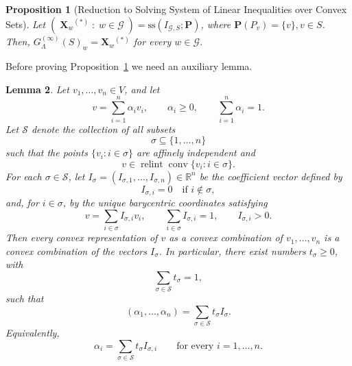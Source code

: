 \documentclass[10pt]{amsart}
\theoremstyle{plain}
\newtheorem{lemma}{Lemma}[section]
\newtheorem{proposition}[lemma]{Proposition}
\theoremstyle{definition}
\providecommand{\cG}[0]{\ensuremath{\mathcal G}\xspace}
\providecommand{\bP}[0]{\ensuremath{\mathbf P}\xspace}
\providecommand{\bX}[0]{\ensuremath{\mathbf X}\xspace}
\let\geq\geqslant
\providecommand{\p}[1]{\ensuremath{^{\left(#1\right)}}\xspace}
\providecommand{\ssol}{\ensuremath{\mathrm{ss}}\xspace}
\begin{document}
\begin{proposition}[Reduction to Solving System of Linear Inequalities over Convex Sets]
\label{prop:reduction-lam-system}
    Let 
    $\left( \; \bX_w\p* \;\colon\; w\in\cG \; \right) = \ssol(I_{\cG,S};\bP)$,
    where $\bP(P_v) = \{v\}, v \in S$.
    Then, $G^{(\infty)}_\Lambda(S)_w = \bX_w\p*$ for every $w\in\cG$. 
\end{proposition}

Before proving Proposition~\ref{prop:reduction-lam-system} we need an auxiliary lemma.

\begin{lemma}
\label{lem:new}
Let \(v_1,\ldots,v_n \in 
V\), and let
\[
v=\sum_{i=1}^n \alpha_i v_i,
\qquad 
\alpha_i\geq 0,
\qquad
\sum_{i=1}^n \alpha_i=1.
\]
Let \(\mathcal S\) denote the collection of all subsets
\[
\sigma \subseteq \{1,\ldots,n\}
\]
such that the points \(\{v_i : i\in \sigma\}\) are affinely independent and
\[
v \in \operatorname{relint}
\operatorname{conv}\{v_i : i\in \sigma\}.
\]
For each \(\sigma\in\mathcal S\), let \(I_\sigma=(I_{\sigma,1},\ldots,I_{\sigma,n})\in\mathbb{R}^n\) be the coefficient vector defined by
\[
I_{\sigma,i}=0 \quad\text{if } i\notin \sigma,
\]
and, for \(i\in \sigma\), by the unique barycentric coordinates satisfying
\[
v=\sum_{i\in\sigma} I_{\sigma,i}v_i,
\qquad
\sum_{i\in\sigma} I_{\sigma,i}=1,
\qquad
I_{\sigma,i}>0.
\]
Then every convex representation of \(v\) as a convex combination of
\(v_1,\ldots,v_n\) is a convex combination of the vectors \(I_\sigma\).
In particular, there exist numbers \(t_\sigma\geq 0\), with
\[
\sum_{\sigma\in\mathcal S} t_\sigma=1,
\]
such that
\[
(\alpha_1,\ldots,\alpha_n)
=
\sum_{\sigma\in\mathcal S} t_\sigma I_\sigma.
\]
Equivalently,
\[
\alpha_i
=
\sum_{\sigma\in\mathcal S} t_\sigma I_{\sigma,i}
\qquad
\text{for every } i=1,\ldots,n.
\]
\end{lemma}
\end{document}

